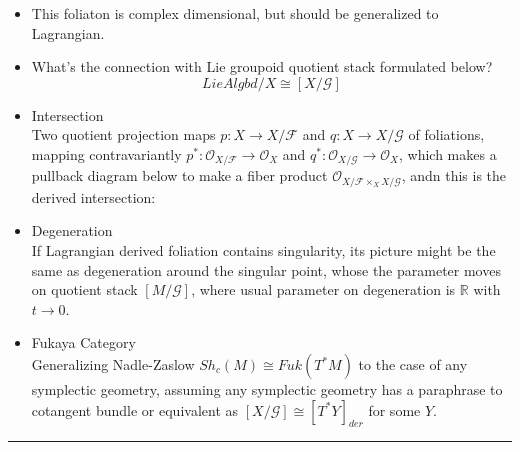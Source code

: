 \documentclass{article}
\begin{document}
\begin{conjecture}{}{}
\begin{itemize}
\item This foliaton is complex dimensional, but should be generalized to Lagrangian.

\item What's the connection with Lie groupoid quotient stack formulated below?
\[ LieAlgbd/X \cong [X/\mathcal{G}]\]

\item Intersection \\
Two quotient projection maps $p:X\to X/\mathcal{F}$ and $q:X\to X/\mathcal{G}$ of foliations, mapping contravariantly
$p^*: \mathcal{O}_{X/\mathcal{F}} \to \mathcal{O}_X$ and $q^*: \mathcal{O}_{X/\mathcal{G}} \to \mathcal{O}_X$,
which makes a pullback diagram below to make a fiber product $\mathcal{O}_{X/\mathcal{F} \times_X X/\mathcal{G}}$, 
andn this is the derived intersection: \\

\item Degeneration \\
If Lagrangian derived foliation contains singularity, its picture might be the same as degeneration around the singular point,
whose the parameter moves on quotient stack $[M/\mathcal{G}]$, where usual parameter on degeneration is $\mathbb{R}$ with $t\to 0$.

\item Fukaya Category \\
Generalizing Nadle-Zaslow $Sh_c(M) \cong Fuk (T^*M)$ to the case of any symplectic geometry,
assuming any symplectic geometry has a paraphrase to cotangent bundle or equivalent as $[X/\mathcal{G}] \cong [T^* Y]_{der}$ for some $Y$.

\end{itemize}
\end{conjecture}



\vspace{0.5cm}
\noindent\rule{\textwidth}{0.4pt}
\vspace{0.5cm}
\end{document}
